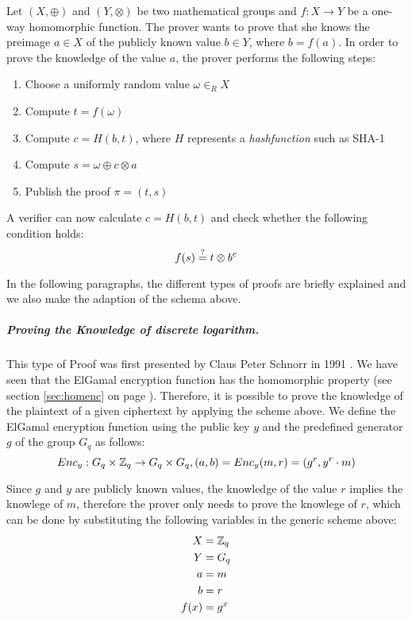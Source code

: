 \documentclass[numbers=noenddot, abstract=on]{scrreprt}
\newcommand{\myref}[1]{(see section \ref{#1} on page \pageref{#1})}
\begin{document}
Let $(X,\oplus)$ and $(Y,\otimes)$ be two mathematical groups and
$f:X \rightarrow Y$ be a one-way homomorphic function. The prover wants to prove
that she knows the preimage $a \in X$ of the publicly known value $b \in Y$,
where $b=f(a)$. In order to prove the knowledge of the value $a$, the prover
performs the following steps:
\begin{enumerate}
  \item Choose a uniformly random value $\omega \in_R X$
  \item Compute $t=f(\omega)$
  \item Compute $c=H(b,t)$, where $H$ represents a \textit{hashfunction} such as
  SHA-1
  \item Compute $s=\omega \oplus c \otimes a$
  \item Publish the proof $\pi = (t,s)$
\end{enumerate}

A verifier can now calculate $c=H(b,t)$ and check whether the following
condition holds:
\begin{equation}
	f(s) \stackrel{?}{=} t \otimes b^c \notag
\end{equation}

 In the following paragraphs, the different types of proofs are briefly
 explained and we also make the adaption of the schema above.
 
\subparagraph{Proving the Knowledge of discrete logarithm.}
This type of Proof was first presented by Claus Peter Schnorr in 1991
\cite{Schnorr91}. We have seen that the ElGamal encryption function has the
homomorphic property \myref{sec:homenc}. Therefore, it is possible to prove the
knowledge of the plaintext of a given ciphertext by applying the scheme above.
We define the ElGamal encryption function using the public key $y$ and the
predefined generator $g$ of the group $G_q$ as follows:
\begin{equation}
	Enc_y:G_q \times \mathbb{Z}_q \rightarrow G_q \times G_q, (a,b) = Enc_y(m,
	r)=(g^r, y^r \cdot m) \notag
\end{equation} 

Since $g$ and $y$ are publicly known values, the knowledge of the value $r$
implies the knowlege of $m$, therefore the prover only needs to prove the
knowlege of $r$, which can be done by substituting the following variables in
the generic scheme above:
\begin{align}
  X &= \mathbb{Z}_q \notag \\
  Y &= G_q \notag \\
  a &=m \notag \\
  b &=r \notag \\
  f(x) &= g^x \notag
\end{align} 
\end{document}
